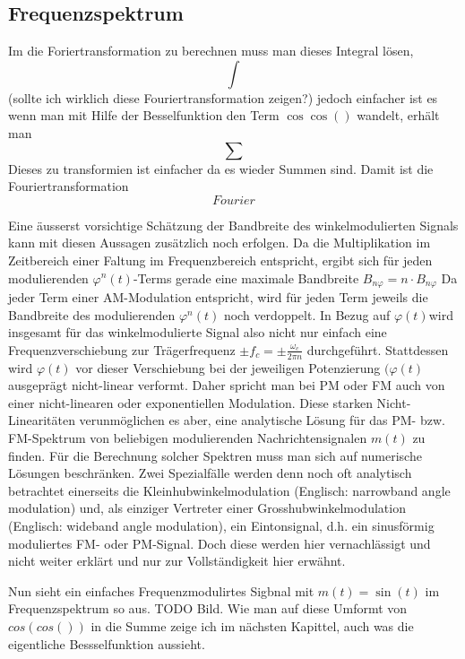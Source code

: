 \subsection{Frequenzspektrum}

Im die Foriertransformation zu berechnen muss man dieses Integral lösen,
\[
    \int
\]
(sollte ich wirklich diese Fouriertransformation zeigen?)
jedoch einfacher ist es wenn man mit Hilfe der Besselfunktion den Term \( \cos \cos()\) wandelt,  erhält man
\[
    \sum
\]
Dieses zu transformien ist einfacher da es wieder Summen sind.
Damit ist die Fouriertransformation
\[
    Fourier
    \label{fm:FM:fourie}
\]

Eine äusserst vorsichtige Schätzung der Bandbreite des winkelmodulierten Signals kann mit diesen Aussagen zusätzlich noch erfolgen.
Da die Multiplikation im Zeitbereich einer Faltung im Frequenzbereich entspricht, ergibt sich für jeden modulierenden \(\varphi^n (t)\)-Terms gerade 
eine maximale Bandbreite \(B_{n\varphi} = n \cdot B_{n\varphi}\)
Da jeder Term einer AM-Modulation entspricht, wird für jeden Term jeweils die Bandbreite des modulierenden \(\varphi^n (t)\) noch verdoppelt.
In Bezug auf \(\varphi(t)\)wird insgesamt für das winkelmodulierte Signal also nicht nur einfach eine 
Frequenzverschiebung zur Trägerfrequenz \(\pm f_c = \pm \frac{\omega_c}{2\pi n}\) durchgeführt.
Stattdessen wird \(\varphi(t)\) vor dieser Verschiebung bei der jeweiligen Potenzierung \((\varphi(t)\) ausgeprägt nicht-linear verformt.
Daher spricht man bei PM oder FM auch von einer nicht-linearen oder exponentiellen Modulation.
Diese starken Nicht-Linearitäten verunmöglichen es aber, eine analytische Lösung für das PM- bzw. FM-Spektrum von beliebigen modulierenden Nachrichtensignalen \(m(t)\) zu finden.
Für die Berechnung solcher Spektren muss man sich auf numerische Lösungen beschränken.
Zwei Spezialfälle werden denn noch oft analytisch betrachtet einerseits die Kleinhubwinkelmodulation (Englisch: narrowband angle modulation) und, als
einziger Vertreter einer Grosshubwinkelmodulation (Englisch: wideband angle modulation), ein Eintonsignal, d.h. ein sinusförmig moduliertes FM- oder PM-Signal.
Doch diese werden hier vernachlässigt und nicht weiter erklärt und nur zur Vollständigkeit hier erwähnt.

Nun sieht ein einfaches Frequenzmodulirtes Sigbnal mit \(m(t) = \sin(t)\) im Frequenzspektrum so aus.
TODO Bild.
Wie man auf diese Umformt von \(cos (cos())\) in die Summe zeige ich im nächsten Kapittel, auch was die eigentliche Bessselfunktion aussieht.

